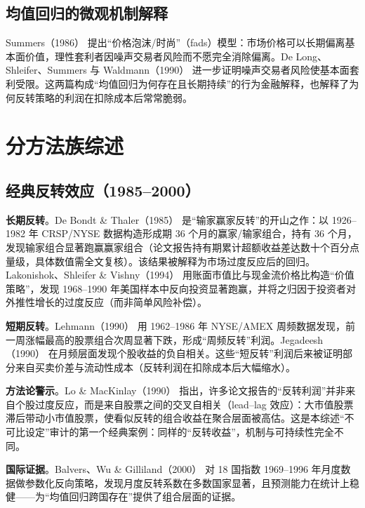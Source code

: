 \documentclass[11pt,a4paper]{ctexart}
\begin{document}
\subsection{均值回归的微观机制解释}

Summers（1986）\cite{summers1986} 提出“价格泡沫/时尚”（fads）模型：市场价格可以长期偏离基本面价值，理性套利者因噪声交易者风险而不愿完全消除偏离。De Long、Shleifer、Summers 与 Waldmann（1990）\cite{delong1990} 进一步证明噪声交易者风险使基本面套利受限。这两篇构成“均值回归为何存在且长期持续”的行为金融解释，也解释了为何反转策略的利润在扣除成本后常常脆弱。

\section{分方法族综述}\label{sec:survey}

\subsection{经典反转效应（1985--2000）}\label{sec:reversal}

\textbf{长期反转}。De Bondt \& Thaler（1985）\cite{debondt1985} 是“输家赢家反转”的开山之作：以 1926--1982 年 CRSP/NYSE 数据构造形成期 36 个月的赢家/输家组合，持有 36 个月，发现输家组合显著跑赢赢家组合（论文报告持有期累计超额收益差达数十个百分点量级，具体数值需全文复核）。该结果被解释为市场过度反应后的回归。Lakonishok、Shleifer \& Vishny（1994）\cite{lakonishok1994} 用账面市值比与现金流价格比构造“价值策略”，发现 1968--1990 年美国样本中反向投资显著跑赢，并将之归因于投资者对外推性增长的过度反应（而非简单风险补偿）。

\textbf{短期反转}。Lehmann（1990）\cite{lehmann1990} 用 1962--1986 年 NYSE/AMEX 周频数据发现，前一周涨幅最高的股票组合次周显著下跌，形成“周频反转”利润。Jegadeesh（1990）\cite{jegadeesh1990} 在月频层面发现个股收益的负自相关。这些“短反转”利润后来被证明部分来自买卖价差与流动性成本（反转利润在扣除成本后大幅缩水）。

\textbf{方法论警示}。Lo \& MacKinlay（1990）\cite{lomackinlay1990} 指出，许多论文报告的“反转利润”并非来自个股过度反应，而是来自股票之间的交叉自相关（lead--lag 效应）：大市值股票滞后带动小市值股票，使看似反转的组合收益在聚合层面被高估。这是本综述“不可比设定”审计的第一个经典案例：同样的“反转收益”，机制与可持续性完全不同。

\textbf{国际证据}。Balvers、Wu \& Gilliland（2000）\cite{balvers2000} 对 18 国指数 1969--1996 年月度数据做参数化反向策略，发现月度反转系数在多数国家显著，且预测能力在统计上稳健——为“均值回归跨国存在”提供了组合层面的证据。
\end{document}
